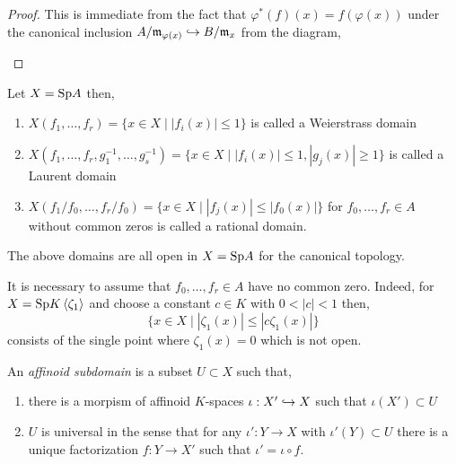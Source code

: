\documentclass[12pt]{article}
\begin{document}
\begin{proof}
This is immediate from the fact that $\varphi^*(f)(x) = f(\varphi(x))$ under the canonical inclusion $A / \mathfrak{m}_{\varphi(x)} \hookrightarrow B / \mathfrak{m}_x$ from the diagram,
\begin{center}
\end{center}
\end{proof}

\begin{defn}
Let $X = \mathrm{Sp}{A}$ then,
\begin{enumerate}
\item $X(f_1, \dots, f_r) = \{ x \in X \mid |f_i(x)| \le 1 \}$ is called a Weierstrass domain
\item $X(f_1, \dots, f_r, g_1^{-1}, \dots, g_s^{-1}) = \{ x \in X \mid |f_i(x)| \le 1, |g_j(x)| \ge 1 \}$
is called a Laurent domain
\item $X(f_1/f_0, \dots, f_r/f_0) = \{ x \in X \mid |f_j(x)| \le |f_0(x)| \}$ for $f_0, \dots, f_r \in A$ without common zeros is called a rational domain.
\end{enumerate}
\end{defn}

\begin{lemma}
The above domains are all open in $X = \mathrm{Sp}{A}$ for the canonical topology. 
\end{lemma}

\begin{example}
It is necessary to assume that $f_0, \dots, f_r \in A$ have no common zero. Indeed, for $X = \mathrm{Sp}{K \left< \zeta_1 \right>}$ and choose a constant $c \in K$ with $0 < |c| < 1$ then,
\[ \{ x \in X \mid |\zeta_1(x)| \le |c\zeta_1(x)| \} \]
consists of the single point where $\zeta_1(x) = 0$ which is not open.
\end{example}


\begin{defn}
An \textit{affinoid subdomain} is a subset $U \subset X$ such that,
\begin{enumerate}
\item there is a morpism of affinoid $K$-spaces $\iota : X' \hookrightarrow X$ such that $\iota(X') \subset U$
\item $U$ is universal in the sense that for any $\iota' : Y \to X$ with $\iota'(Y) \subset U$ there is a unique factorization $f : Y \to X'$ such that $\iota' = \iota \circ f$.
\end{enumerate}
\end{defn}
\end{document}

